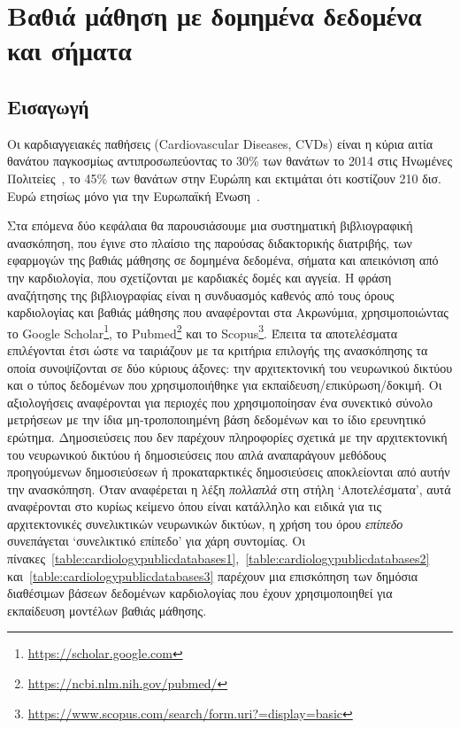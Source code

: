 \chapter{Βαθιά μάθηση με δομημένα δεδομένα και σήματα}
\label{chapter3}
\graphicspath{{./images/deep-learning-in-cardiology/}}

\section{Εισαγωγή}
Οι καρδιαγγειακές παθήσεις (Cardiovascular Diseases, CVDs) είναι η κύρια αιτία θανάτου παγκοσμίως αντιπροσωπεύοντας το 30\% των θανάτων το 2014 στις Ηνωμένες Πολιτείες~\cite{benjamin2017heart}, το 45\% των θανάτων στην Ευρώπη και εκτιμάται ότι κοστίζουν 210 δισ. Ευρώ ετησίως μόνο για την Ευρωπαϊκή Ένωση~\cite{wilkins2017european}.

Στα επόμενα δύο κεφάλαια θα παρουσιάσουμε μια συστηματική βιβλιογραφική ανασκόπηση, που έγινε στο πλαίσιο της παρούσας διδακτορικής διατριβής, των εφαρμογών της βαθιάς μάθησης σε δομημένα δεδομένα, σήματα και απεικόνιση από την καρδιολογία, που σχετίζονται με καρδιακές δομές και αγγεία.
Η φράση αναζήτησης της βιβλιογραφίας είναι η συνδυασμός καθενός από τους όρους καρδιολογίας και βαθιάς μάθησης που αναφέρονται στα Ακρωνύμια, χρησιμοποιώντας το Google Scholar\footnote{\url{https://scholar.google.com}}, το Pubmed\footnote{\url{https://ncbi.nlm.nih.gov/pubmed/}} και το Scopus\footnote{\url{https://www.scopus.com/search/form.uri?=display=basic}}.
Έπειτα τα αποτελέσματα επιλέγονται έτσι ώστε να ταιριάζουν με τα κριτήρια επιλογής της ανασκόπησης τα οποία συνοψίζονται σε δύο κύριους άξονες: την αρχιτεκτονική του νευρωνικού δικτύου και ο τύπος δεδομένων που χρησιμοποιήθηκε για εκπαίδευση/επικύρωση/δοκιμή.
Οι αξιολογήσεις αναφέρονται για περιοχές που χρησιμοποίησαν ένα συνεκτικό σύνολο μετρήσεων με την ίδια μη-τροποποιημένη βάση δεδομένων και το ίδιο ερευνητικό ερώτημα.
Δημοσιεύσεις που δεν παρέχουν πληροφορίες σχετικά με την αρχιτεκτονική του νευρωνικού δικτύου ή δημοσιεύσεις που απλά αναπαράγουν μεθόδους προηγούμενων δημοσιεύσεων ή προκαταρκτικές δημοσιεύσεις αποκλείονται από αυτήν την ανασκόπηση.
Όταν αναφέρεται η λέξη \textit{πολλαπλά} στη στήλη `Αποτελέσματα', αυτά αναφέρονται στο κυρίως κείμενο όπου είναι κατάλληλο και ειδικά για τις αρχιτεκτονικές συνελικτικών νευρωνικών δικτύων, η χρήση του όρου \textit{επίπεδο} συνεπάγεται `συνελικτικό επίπεδο' για χάρη συντομίας.
Οι πίνακες~\ref{table:cardiologypublicdatabases1},~\ref{table:cardiologypublicdatabases2} και~\ref{table:cardiologypublicdatabases3} παρέχουν μια επισκόπηση των δημόσια διαθέσιμων βάσεων δεδομένων καρδιολογίας που έχουν χρησιμοποιηθεί για εκπαίδευση μοντέλων βαθιάς μάθησης.

